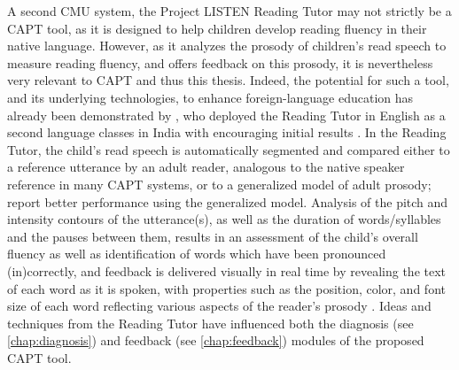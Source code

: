 	A second CMU system, the Project LISTEN Reading Tutor \citep{Mostow2012} 
may not strictly be a CAPT tool, as it 
is designed to help children develop reading fluency in their native language. 
However, as 
it analyzes the prosody of children's read speech to measure reading fluency, and offers feedback on this prosody, 
it is nevertheless very relevant to CAPT and thus this thesis. 
	Indeed, the potential for such a tool, and its underlying technologies, to enhance foreign-language education has already been demonstrated by 
	\textcite{Weber2010}, who deployed the Reading Tutor in English as a second language classes in India with encouraging initial results . 
	In the Reading Tutor, the child's read speech is automatically segmented and compared either to a reference utterance by an adult reader, analogous to the native speaker reference in many CAPT systems, or to a generalized model of adult prosody; \textcite{Duong2011} report better performance using the generalized model. Analysis of the pitch and intensity contours of the utterance(s), as well as the duration of words/syllables and the pauses between them, results in an assessment of the child's overall fluency as well as identification of words which have been pronounced (in)correctly, and feedback is delivered visually in real time by revealing the text of each word as it is spoken, with properties such as the position, color, and font size of each word reflecting various aspects of the reader's prosody \citep{Sitaram2011}. Ideas and techniques from the Reading Tutor have influenced both the diagnosis (see \cref{chap:diagnosis}) and feedback (see \cref{chap:feedback}) modules of the proposed CAPT tool. 
	
